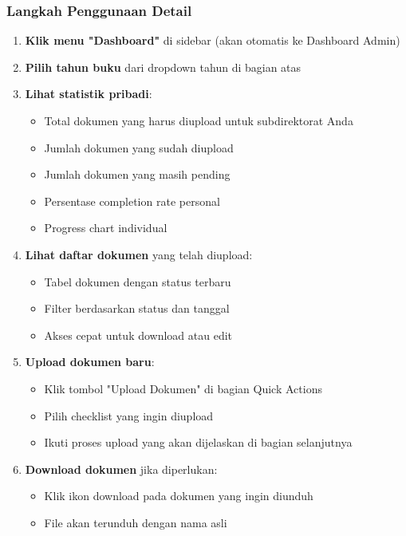 \documentclass[12pt,a4paper]{article}
\begin{document}
\subsubsection{Langkah Penggunaan Detail}
\begin{enumerate}
\item \textbf{Klik menu "Dashboard"} di sidebar (akan otomatis ke Dashboard Admin)
\item \textbf{Pilih tahun buku} dari dropdown tahun di bagian atas
\item \textbf{Lihat statistik pribadi}:
\begin{itemize}
\item Total dokumen yang harus diupload untuk subdirektorat Anda
\item Jumlah dokumen yang sudah diupload
\item Jumlah dokumen yang masih pending
\item Persentase completion rate personal
\item Progress chart individual
\end{itemize}
\item \textbf{Lihat daftar dokumen} yang telah diupload:
\begin{itemize}
\item Tabel dokumen dengan status terbaru
\item Filter berdasarkan status dan tanggal
\item Akses cepat untuk download atau edit
\end{itemize}
\item \textbf{Upload dokumen baru}:
\begin{itemize}
\item Klik tombol "Upload Dokumen" di bagian Quick Actions
\item Pilih checklist yang ingin diupload
\item Ikuti proses upload yang akan dijelaskan di bagian selanjutnya
\end{itemize}
\item \textbf{Download dokumen} jika diperlukan:
\begin{itemize}
\item Klik ikon download pada dokumen yang ingin diunduh
\item File akan terunduh dengan nama asli
\end{itemize}
\end{enumerate}
\end{document}

